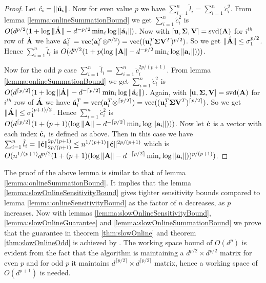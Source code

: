 \begin{proof}{\label{proof:slowOnlineSummationBound}}
 Let $\acute{c}_{i} = \|\acute{\mathbf{u}}_{i}\|$. Now for even value $p$ we have $\sum_{i=1}^{n} \tilde{l}_{i}=\sum_{i=1}^{n}\acute{c}_{i}^{2}$. From lemma \ref{lemma:onlineSummationBound} we get $\sum_{i=1}^{n} \acute{c}_{i}^{2}$ is $O(d^{p/2}(1+\log \|\acute{\mathbf{A}}\|-d^{-p/2}\min_{i}\log \|\acute{\mathbf{a}}_{i}\|)$. Now with $[\mathbf{u},\mathbf{\Sigma},\mathbf{V}] = \mbox{svd}(\mathbf{A})$ for $i^{th}$ row of $\acute{\mathbf{A}}$ we have $\acute{\mathbf{a}}_{i}^{T} = \mbox{vec}(\mathbf{a}_{i}^{T} \otimes^{p/2}) = \mbox{vec}((\mathbf{u}_{i}^{T}\mathbf{\Sigma}\mathbf{V}^{T})^{p/2})$. So we get $\|\acute{\mathbf{A}}\| \leq \sigma_{1}^{p/2}$. Hence $\sum_{i=1}^{n}\tilde{l}_i$ is $O(d^{p/2}(1+p(\log \|\mathbf{A}\|-d^{-p/2}\min_{i}\log \|\mathbf{a}_{i}\|)))$. 
 
 Now for the odd $p$ case $\sum_{i=1}^{n} \tilde{l}_{i}=\sum_{i=1}^{n}\acute{c}_{i}^{2p/(p+1)}$. From lemma \ref{lemma:onlineSummationBound} we get $\sum_{i=1}^{n} \acute{c}_{i}^{2}$ is $O(d^{\lceil p/2\rceil}(1+\log \|\acute{\mathbf{A}}\|-d^{-\lceil p/2\rceil}\min_{i}\log \|\acute{\mathbf{a}}_{i}\|)$. Again, with $[\mathbf{u},\mathbf{\Sigma},\mathbf{V}] = \mbox{svd}(\mathbf{A})$ for $i^{th}$ row of $\acute{\mathbf{A}}$ we have $\acute{\mathbf{a}}_{i}^{T} = \mbox{vec}(\mathbf{a}_{i}^{T} \otimes^{\lceil p/2 \rceil}) = \mbox{vec}((\mathbf{u}_{i}^{T}\mathbf{\Sigma}\mathbf{V}^{T})^{\lceil p/2\rceil})$. So we get $\|\acute{\mathbf{A}}\| \leq \sigma_{1}^{(p+1)/2}$. Hence $\sum_{i=1}^{n}\acute{c}_i^2$ is $O(d^{\lceil p/2 \rceil}(1+(p+1)(\log \|\mathbf{A}\|-d^{-\lceil p/2\rceil}\min_{i}\log \|\mathbf{a}_{i}\|)))$. Now let $\acute{\mathbf{c}}$ is a vector with each index $\acute{\mathbf{c}}_{i}$ is defined as above. Then in this case we have $\sum_{i=1}^{n}\tilde{l}_{i} = \|\acute{\mathbf{c}}\|_{2p/(p+1)}^{2p/(p+1)} \leq n^{1/(p+1)}\|\acute{\mathbf{c}}\|^{2p/(p+1)}$ which is $O(n^{1/(p+1)}d^{p/2}(1+(p+1)(\log \|\mathbf{A}\|-d^{-\lceil p/2\rceil}\min_{i}\log \|\mathbf{a}_{i}\|))^{p/(p+1)})$.
\end{proof}
% 
The proof of the above lemma is similar to that of lemma \ref{lemma:onlineSummationBound}. It implies that the lemma \ref{lemma:slowOnlineSensitivityBound} gives tighter sensitivity bounds compared to lemma \ref{lemma:onlineSensitivityBound} as the factor of $n$ decreases, as $p$ increases. Now with lemmas \ref{lemma:slowOnlineSensitivityBound}, \ref{lemma:slowOnlineGuarantee} and \ref{lemma:slowOnlineSummationBound} we prove that the guarantee in theorem \ref{thm:slowOnline} and theorem \ref{thm:slowOnlineOdd} is achieved by . The working space bound of $O(d^{p})$ is evident from the fact that the algorithm is maintaining a $d^{p/2} \times d^{p/2}$ matrix for even $p$ and for odd $p$ it maintains $d^{\lceil p/2 \rceil} \times d^{\lceil p/2 \rceil}$ matrix, hence a working space of $O(d^{p+1})$ is needed.